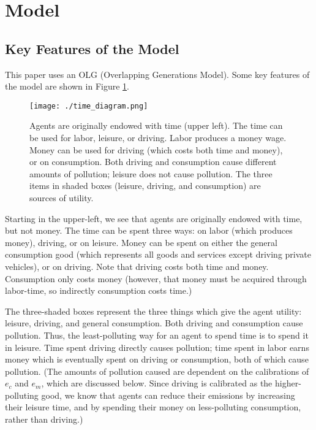\documentclass[letter, 12pt, epsf,leqno]{article}
\begin{document}
\section{Model}\label{sec:model}

\subsection{Key Features of the Model}

This paper uses an OLG (Overlapping Generations Model).  Some key features of the model are shown in Figure \ref{fig:time_diagram}.   

\begin{figure}[H]
\hspace{0.5in}
	\texttt{[image: ./time\_diagram.png]}%
\caption{\scriptsize  Agents are originally endowed with time (upper left).  The time can be used for labor, leisure, or driving.  Labor produces a money wage.  Money can be used for driving (which costs both time and money), or on consumption.  Both driving and consumption cause different amounts of pollution; leisure does not cause pollution.  The three items in shaded boxes (leisure, driving, and consumption) are sources of utility.
}\label{fig:time_diagram}
\end{figure}


Starting in the upper-left, we see that agents are originally endowed with time, but not money.  The time can be spent three ways: on labor (which produces money), driving, or on leisure.  Money can be spent on either the general consumption good (which represents all goods and services except driving private vehicles), or on driving.  Note that driving costs both time and money.  Consumption only costs money (however, that money must be acquired through labor-time, so indirectly consumption costs time.)

The three-shaded boxes represent the three things which give the agent utility: leisure, driving, and general consumption.  Both driving and consumption cause pollution.  Thus, the least-polluting way for an agent to spend time is to spend it in leisure.  Time spent driving directly causes pollution; time spent in labor earns money which is eventually spent on driving or consumption, both of which cause pollution.  (The amounts of pollution caused are dependent on the calibrations of $e_c$ and $e_m$, which are discussed below.  Since driving is calibrated as the higher-polluting good, we know that agents can reduce their emissions by increasing their leisure time, and by spending their money on less-polluting consumption, rather than driving.)
	
\end{document}
